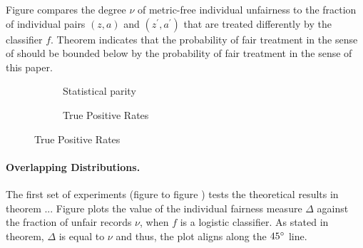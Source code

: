 \documentclass{article}
\begin{document}
\bigskip
Figure compares the degree $\nu$ of metric-free individual unfairness to the fraction of individual pairs $(z, a)$ and $(z^{'}, a^{'})$ that are treated differently by the classifier $f$. Theorem indicates that the probability of fair treatment in the sense of \cite{dwork2012fairness} should be bounded below by the probability of fair treatment in the sense of this paper. 

\begin{figure}
\begin{subfigure} {.5\linewidth}
\caption{Statistical parity}
\label{fig: 1a}
\end{subfigure}
\begin{subfigure} {.5\linewidth}
\caption{True Positive Rates}
\label{fig: 1b}
\end{subfigure}

\end{figure}

\paragraph{Overlapping Distributions.}
The first set of experiments (figure to figure ) tests the theoretical results in theorem ... Figure plots the value of the individual fairness measure $\Delta$ against the fraction of unfair records $\nu$, when $f$ is a logistic classifier. As stated in theorem, $\Delta$ is equal to $\nu$ and thus, the plot aligns along the $45\degree$ line. 
\end{document}
